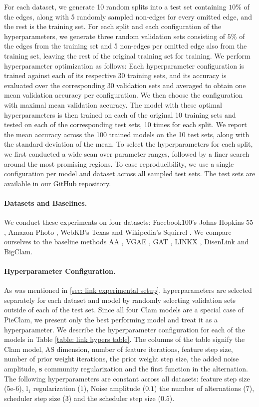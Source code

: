 \documentclass{article}
\theoremstyle{plain}
\theoremstyle{definition}
\theoremstyle{remark}
\begin{document}
For each dataset, we generate 10 random splits into a test set  containing $10\%$ of the edges, along with 5 randomly sampled non-edges for every omitted edge, and the rest is the training set. For each split and each configuration of the hyperparameters, we generate three random validation sets consisting of $5\%$ of the edges from the training set and 5  non-edges per omitted edge also from the training set, leaving the rest of the original training set for training.  We perform hyperparameter optimization as follows: Each hyperparameter configuration is trained against each of its respective 30 training sets, and its accuracy is evaluated over the corresponding 30 validation sets and averaged to obtain one mean validation accuracy per configuration. We then choose the configuration with maximal mean validation accuracy. The model with these optimal hyperparameters  is then trained on each of the original 10 training sets and tested on each of the corresponding test sets, 10 times for each split. We report the mean accuracy across the 100 trained models on the 10 test sets, along with the standard deviation of the mean.  To select the hyperparameters for each split, we
first conducted a wide scan over parameter ranges, followed by a finer search around the most promising regions. To ease reproducibility, we use a single configuration per model and dataset across all sampled test sets. The test sets are available in our GitHub repository.

\paragraph{Datasets and Baselines.}
We conduct these experiments on four datasets: Facebook100’s Johns Hopkins 55 \cite{lim2021hopkins}, Amazon Photo \cite{shchur2018photo}, WebKB’s Texas and Wikipedia’s Squirrel \cite{pei2020texasquirrel}. We compare ourselves to the baseline methods AA \cite{adamic2003friends}, VGAE \cite{kipf2016variational}, GAT \cite{GAT}, LINKX \cite{lim2021linkx}, DisenLink \cite{zhou2022disenlink} and BigClam.


\paragraph{Hyperparameter Configuration.}
As was mentioned in \ref{sec: link experimental setup}, hyperparameters are selected separately for each dataset and model by randomly selecting validation sets outside of each of the test set. Since all four Clam models are a special case of PieClam, we present only the best performing model and treat it as a hyperparameter. We describe the hyperparameter configuration for each of the models in Table \ref{table: link hypers table}. The columns of the table signify the Clam model, AS dimension, number of feature iterations, feature step size, number of prior weight iterations, the prior weight step size, the added noise amplitude, $\mathbf{s}$ community regularization and the first function in the alternation. The following hyperparameters are constant across all datasets: feature step size (5e-6), l$_1$ regularization ($1$), Noise amplitude ($0.1$) the number of alternations ($7$), scheduler step size ($3$) and the scheduler step size ($0.5$).
\end{document}

